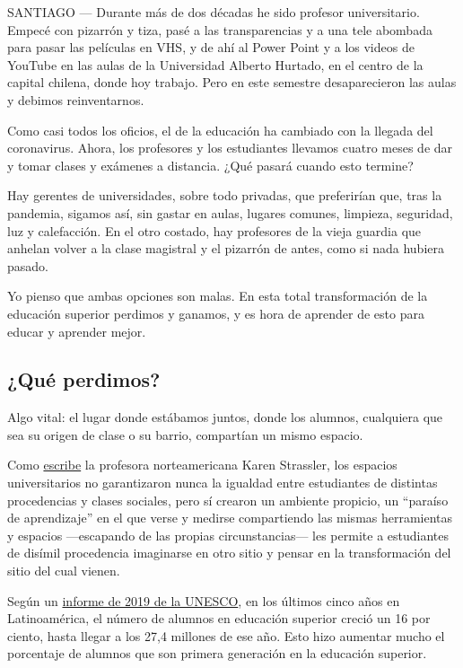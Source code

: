 SANTIAGO --- Durante más de dos décadas he sido profesor universitario.
Empecé con pizarrón y tiza, pasé a las transparencias y a una tele
abombada para pasar las películas en VHS, y de ahí al Power Point y a
los videos de YouTube en las aulas de la Universidad Alberto Hurtado, en
el centro de la capital chilena, donde hoy trabajo. Pero en este
semestre desaparecieron las aulas y debimos reinventarnos.

Como casi todos los oficios, el de la educación ha cambiado con la
llegada del coronavirus. Ahora, los profesores y los estudiantes
llevamos cuatro meses de dar y tomar clases y exámenes a distancia. ¿Qué
pasará cuando esto termine?

Hay gerentes de universidades, sobre todo privadas, que preferirían que,
tras la pandemia, sigamos así, sin gastar en aulas, lugares comunes,
limpieza, seguridad, luz y calefacción. En el otro costado, hay
profesores de la vieja guardia que anhelan volver a la clase magistral y
el pizarrón de antes, como si nada hubiera pasado.

Yo pienso que ambas opciones son malas. En esta total transformación de
la educación superior perdimos y ganamos, y es hora de aprender de esto
para educar y aprender mejor.

\hypertarget{quuxe9-perdimos}{%
\subsection{¿Qué perdimos?}\label{quuxe9-perdimos}}

Algo vital: el lugar donde estábamos juntos, donde los alumnos,
cualquiera que sea su origen de clase o su barrio, compartían un mismo
espacio.

Como
\href{https://www.nytimes.com/es/2020/05/08/espanol/opinion/zoom-escuela-clases.html}{escribe}
la profesora norteamericana Karen Strassler, los espacios universitarios
no garantizaron nunca la igualdad entre estudiantes de distintas
procedencias y clases sociales, pero sí crearon un ambiente propicio, un
``paraíso de aprendizaje'' en el que verse y medirse compartiendo las
mismas herramientas y espacios ---escapando de las propias
circunstancias--- les permite a estudiantes de disímil procedencia
imaginarse en otro sitio y pensar en la transformación del sitio del
cual vienen.

Según un
\href{https://www.iesalc.unesco.org/en/2019/09/25/unesco-iesalc-reveals-that-only-38-of-mobility-from-latin-america-and-the-caribbean-is-to-the-same-region/}{informe
de 2019 de la UNESCO}, en los últimos cinco años en Latinoamérica, el
número de alumnos en educación superior creció un 16 por ciento, hasta
llegar a los 27,4 millones de ese año. Esto hizo aumentar mucho el
porcentaje de alumnos que son primera generación en la educación
superior.


